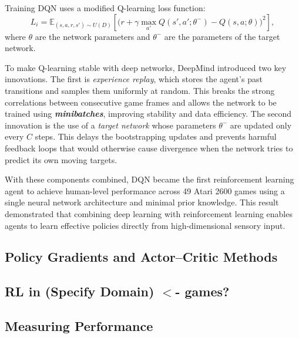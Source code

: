 Training DQN uses a modified Q-learning loss function:
\[
L_i = \mathbb{E}_{(s,a,r,s')\sim U(D)}\left[ \big(r + \gamma \max_{a'} Q(s',a';\theta^{-})
- Q(s,a;\theta) \big)^2 \right],
\]
where $\theta$ are the network parameters and $\theta^{-}$ are the parameters of the
target network.


To make Q-learning stable with deep networks, DeepMind introduced two key innovations.
The first is \textit{experience replay}, which stores the agent’s past transitions and samples
them uniformly at random. This breaks the strong correlations between consecutive game
frames and allows the network to be trained using \textbf{\textit{minibatches}}, improving stability and data
efficiency. The second innovation is the use of a \textit{target network} whose parameters
$\theta^{-}$ are updated only every $C$ steps. This delays the bootstrapping updates and
prevents harmful feedback loops that would otherwise cause divergence when the network
tries to predict its own moving targets.

With these components combined, DQN became the first reinforcement learning agent to
achieve human-level performance across 49 Atari 2600 games using a single neural network
architecture and minimal prior knowledge. This result demonstrated that combining deep
learning with reinforcement learning enables agents to learn effective policies directly from
high-dimensional sensory input.


\subsection{Policy Gradients and Actor--Critic Methods}

\subsection{RL in (Specify Domain) $<$- games?}

\subsection{Measuring Performance}



